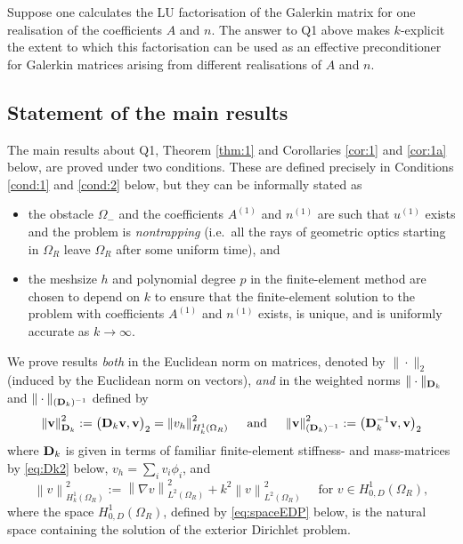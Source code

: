 \documentclass[10pt]{article}%
\numberwithin{equation}{section}
\newcommand{\beq}{\begin{equation}}
\newcommand{\eeq}{\end{equation}}
\newcommand{\bit}{\begin{itemize}}
\newcommand{\eit}{\end{itemize}}
\newcommand{\bv}{\mathbf{v}}
\newcommand{\Oi}{{\Omega_-}}
\newcommand{\gv}{\nabla v}
\newcommand{\HoDkk}{{H^1_{k}(\domain_R)}}
\newcommand{\tendi}{\rightarrow \infty}
\newcommand*{\N}[1]{\left\|#1\right\|}
\newcommand{\tfor}{\text{ for }}
\newcommand{\tand}{\text{ and }}
\newcommand{\domain}{\Omega}
\newcommand{\matrixD}{{\bf D}}
\newcommand{\matrixS}{{\bf S}}
\newcommand{\matrixM}{{\bf M}}
\newcommand{\coeffAo}{A^{(1)}}
\newcommand{\coeffno}{n^{(1)}}
\begin{document}

Suppose one calculates the LU factorisation of the Galerkin matrix for one realisation of the coefficients $A$ and $n$. The answer to Q1 above makes $k$-explicit the extent to which this factorisation can be used as an effective preconditioner for Galerkin matrices arising from different realisations of $A$ and $n$.

\subsection{Statement of the main results}\label{sec:main}
The main results about Q1, Theorem \ref{thm:1} and Corollaries \ref{cor:1} and \ref{cor:1a} below, are proved under two conditions. These are defined precisely in Conditions \ref{cond:1} and \ref{cond:2} below, but they can be informally stated as 
\bit
\item the obstacle $\Oi$ and the coefficients $\coeffAo$ and $\coeffno$ are such that $u^{(1)}$ exists and the problem is \emph{nontrapping} (i.e.~all the rays of geometric optics starting in $\Omega_R$ leave $\Omega_R$ after some uniform time), and
\item the meshsize $h$ and polynomial degree $p$ in the finite-element method are chosen to depend on $k$ to ensure that the 
finite-element solution to the problem with coefficients $\coeffAo$ and $\coeffno$ exists, is unique, and 
is uniformly accurate as $k\tendi$. 
\eit 

We prove results \emph{both} in the Euclidean norm on matrices, denoted by $\|\cdot\|_2$ (induced by the Euclidean norm on vectors), \emph{and} in the weighted norms $\|\cdot\|_{\matrixD_k}$ and $\|\cdot\|_{(\matrixD_k)^{-1}}$ defined by 
\beq\label{eq:Dk}
\N{\bv}_{\matrixD_k}^2:= \big( \matrixD_k \bv, \bv\big)_2 = %
\N{v_h}^2_{\HoDkk}
\quad \tand
\quad \N{\bv}_{(\matrixD_k)^{-1}}^2:= \big( \matrixD_k^{-1} \bv, \bv\big)_2 %
\eeq
where $\matrixD_k$ is given in terms of familiar finite-element stiffness- and mass-matrices by \eqref{eq:Dk2} below, 
$v_h =\sum_i v_i \phi_i$, and 
\beq\label{eq:1knorm}
\N{v}^2_{\HoDkk} := \N{\gv}^2_{L^2(\domain_R)} + k^2 \N{v}^2_{L^2(\domain_R)} \quad \tfor v \in H^1_{0,D}(\domain_R),
\eeq
where the space $H^1_{0,D}(\domain_R)$, defined by \eqref{eq:spaceEDP} below, is the natural space containing the solution of the exterior Dirichlet problem. 
\end{document}

